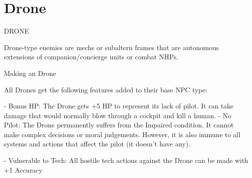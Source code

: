 \section{Drone}
                                                    DRONE   

Drone-type enemies are mechs or subaltern frames that are autonomous extensions of  
companion/concierge units or combat NHPs.  

Making an Drone
 
All Drones get the following features added to their base NPC type:
 
    -    Bonus HP: The Drone gets +5 HP to represent its lack of pilot. It can take damage that  
         would normally blow through a cockpit and kill a human.  
    -    No Pilot: The Drone permanently suffers from the Impaired condition. It cannot make  
         complex decisions or moral judgements. However, it is also immune to all systems and  
         actions that affect the pilot (it doesn’t have any).  

                                                                                                                


     -   Vulnerable to Tech: All hostile tech actions against the Drone can be made with +1  
         Accuracy  